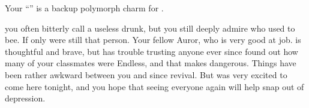 \documentclass[char]{Katmeers}
\begin{document}
\begin{itemz}[Notes]
	\item Your ``\iRing{}'' is a backup polymorph charm for \cHarry{}.
\end{itemz}

\begin{contacts}
	\contact{\cRon{}} you often bitterly call \cRon{} a useless drunk, but you still deeply admire who \cRon{\they} used to bee. If only \cRon{\they} were still that person.
	\contact{\cNeville{}} Your fellow Auror, who is very good at \cNeville{\their}  job. \cNeville{} is thoughtful and brave, but \cNeville{\they} has trouble trusting anyone ever since \cNeville{\they} found out how many of your classmates were Endless, and that makes \cNeville{\them} dangerous.
	\contact{\cHarry{}} Things have been rather awkward between you and \cHarry{} since \cHarry{\their} revival. But \cHarry{} was very excited to come here tonight, and you hope that seeing everyone again will help \cHarry{\them} snap out of \cHarry{\their} depression.
\end{contacts}
\end{document}
